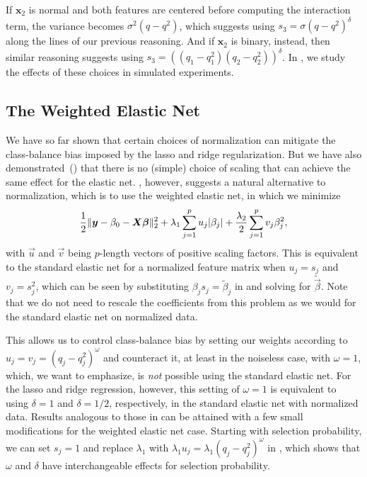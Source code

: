 If \(\bm{x}_2\) is normal and both features are centered before computing the interaction
term, the variance becomes \(\sigma^2 (q-q^2)\), which suggests using \(s_3 = \sigma (q -
q^2)^\delta\) along the lines of our previous reasoning. And if \(\bm{x}_2\) is binary,
instead, then similar reasoning suggests using \(s_3 = ((q_1-q_1^2)(q_2-q_2^2))^\delta\).
In , we study the effects of these choices in simulated
experiments.

\subsection{The Weighted Elastic Net}\label{sec:binary-weighting}

We have so far shown that certain choices of normalization can mitigate the class-balance
bias imposed by the lasso and ridge regularization. But we have also
demonstrated~() that there is no (simple) choice of
scaling that can achieve the same effect for the elastic net.
, however, suggests a natural alternative to normalization,
which is to use the weighted elastic net, in which we minimize
\[
  \frac{1}{2} \lVert \bm{y} - \beta_0 - \bm{X}\bm{\beta}\rVert_2^2 + \lambda_1 \sum_{j=1}^p u_j |\beta_j| + \frac{\lambda_2}{2} \sum_{j=1}^p v_j \beta_j^2,
\]
with \(\vec{u}\) and \(\vec{v}\) being \(p\)-length vectors of positive scaling factors.
This is equivalent to the standard elastic net for a normalized feature matrix when \(u_j =
s_j\) and \(v_j = s_j^2\), which can be seen by substituting \(\beta_js_j =
\tilde{\beta}_j\) in  and solving for \(\tilde{\vec{\beta}}\). Note
that we do not need to rescale the coefficients from this problem as we would for the
standard elastic net on normalized data.

This allows us to control class-balance bias by setting our weights according to \(u_j =
v_j = (q_j - q_j^2)^{\omega}\) and counteract it, at least in the noiseless case, with
\(\omega = 1\), which, we want to emphasize, is \emph{not} possible using the standard
elastic net. For the lasso and ridge regression, however, this setting of \(\omega=1\) is
equivalent to using \(\delta = 1\) and \(\delta = 1/2\), respectively, in the standard
elastic net with normalized data. Results analogous to those in
 can be attained with a few small modifications for the
weighted elastic net case. Starting with selection probability, we can set \(s_j = 1\) and
replace \(\lambda_1\) with \(\lambda_1 u_j = \lambda_1(q_j-q_j^2)^\omega\) in
, which shows that \(\omega\) and \(\delta\) have
interchangeable effects for selection probability.

